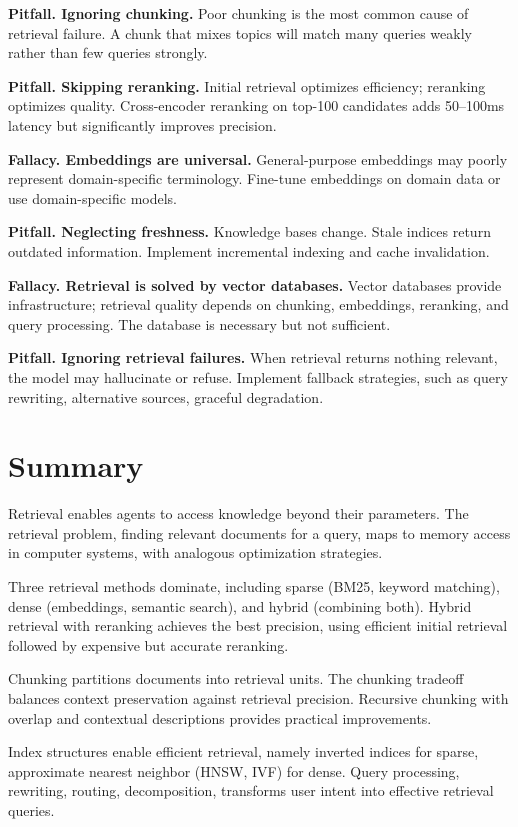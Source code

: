 \textbf{Pitfall. Ignoring chunking.} Poor chunking is the most common cause of retrieval failure. A chunk that mixes topics will match many queries weakly rather than few queries strongly.

\textbf{Pitfall. Skipping reranking.} Initial retrieval optimizes efficiency; reranking optimizes quality. Cross-encoder reranking on top-100 candidates adds 50--100ms latency but significantly improves precision.

\textbf{Fallacy. Embeddings are universal.} General-purpose embeddings may poorly represent domain-specific terminology. Fine-tune embeddings on domain data or use domain-specific models.

\textbf{Pitfall. Neglecting freshness.} Knowledge bases change. Stale indices return outdated information. Implement incremental indexing and cache invalidation.

\textbf{Fallacy. Retrieval is solved by vector databases.} Vector databases provide infrastructure; retrieval quality depends on chunking, embeddings, reranking, and query processing. The database is necessary but not sufficient.

\textbf{Pitfall. Ignoring retrieval failures.} When retrieval returns nothing relevant, the model may hallucinate or refuse. Implement fallback strategies, such as query rewriting, alternative sources, graceful degradation.

\section{Summary}

Retrieval enables agents to access knowledge beyond their parameters. The retrieval problem, finding relevant documents for a query, maps to memory access in computer systems, with analogous optimization strategies.

Three retrieval methods dominate, including sparse (BM25, keyword matching), dense (embeddings, semantic search), and hybrid (combining both). Hybrid retrieval with reranking achieves the best precision, using efficient initial retrieval followed by expensive but accurate reranking.

Chunking partitions documents into retrieval units. The chunking tradeoff balances context preservation against retrieval precision. Recursive chunking with overlap and contextual descriptions provides practical improvements.

Index structures enable efficient retrieval, namely inverted indices for sparse, approximate nearest neighbor (HNSW, IVF) for dense. Query processing, rewriting, routing, decomposition, transforms user intent into effective retrieval queries.

